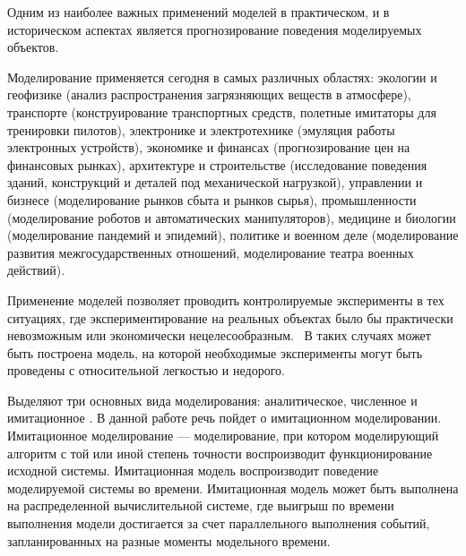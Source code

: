 Одним из наиболее важных применений моделей в практическом, и в историческом аспектах является прогнозирование поведения моделируемых объектов.

Моделирование применяется сегодня в самых различных областях: экологии и геофизике (анализ распространения загрязняющих веществ в атмосфере), транспорте (конструирование транспортных средств, полетные имитаторы для тренировки пилотов), электронике и электротехнике (эмуляция работы электронных устройств), экономике и финансах (прогнозирование цен на финансовых рынках), архитектуре и строительстве (исследование поведения зданий, конструкций и деталей под механической нагрузкой), управлении и бизнесе (моделирование рынков сбыта и рынков сырья), промышленности (моделирование роботов и автоматических манипуляторов), медицине и биологии (моделирование пандемий и эпидемий), политике и военном деле (моделирование развития межгосударственных отношений, моделирование театра военных действий).


Применение моделей позволяет проводить контролируемые эксперименты в тех ситуациях, где экспериментирование на реальных объектах было бы практически невозможным или экономически нецелесообразным.~\cite{Shennon} В таких случаях может быть построена модель, на которой необходимые эксперименты могут быть проведены с относительной легкостью и недорого.



Выделяют три основных вида моделирования: аналитическое, численное и имитационное \cite{disksobmod}. В данной работе речь пойдет о имитационном моделировании. Имитационное моделирование --- моделирование, при котором моделирующий алгоритм с той или иной степень точности воспроизводит функционирование исходной системы. Имитационная модель воспроизводит поведение моделируемой системы во времени. Имитационная модель может быть выполнена на распределенной вычислительной системе, где выигрыш по времени выполнения модели достигается за счет параллельного выполнения событий, запланированных на разные моменты модельного времени.

